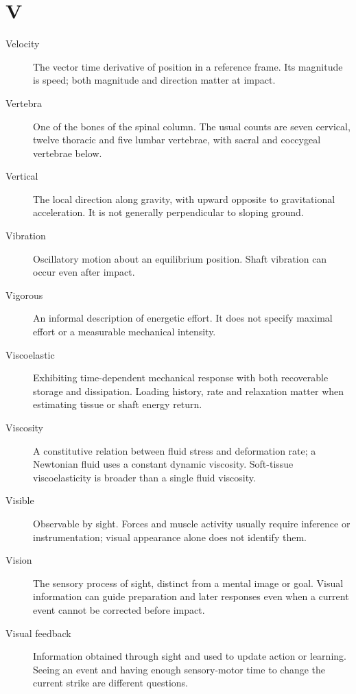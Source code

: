 \section*{V}
\begin{description}

\item[Velocity] The vector time derivative of position in a reference frame. Its magnitude is speed; both magnitude and direction matter at impact.

\item[Vertebra] One of the bones of the spinal column. The usual counts are seven cervical, twelve thoracic and five lumbar vertebrae, with sacral and coccygeal vertebrae below.

\item[Vertical] The local direction along gravity, with upward opposite to gravitational acceleration. It is not generally perpendicular to sloping ground.

\item[Vibration] Oscillatory motion about an equilibrium position. Shaft vibration can occur even after impact.

\item[Vigorous] An informal description of energetic effort. It does not specify maximal effort or a measurable mechanical intensity.

\item[Viscoelastic] Exhibiting time-dependent mechanical response with both recoverable storage and dissipation. Loading history, rate and relaxation matter when estimating tissue or shaft energy return.

\item[Viscosity] A constitutive relation between fluid stress and deformation rate; a Newtonian fluid uses a constant dynamic viscosity. Soft-tissue viscoelasticity is broader than a single fluid viscosity.

\item[Visible] Observable by sight. Forces and muscle activity usually require inference or instrumentation; visual appearance alone does not identify them.

\item[Vision] The sensory process of sight, distinct from a mental image or goal. Visual information can guide preparation and later responses even when a current event cannot be corrected before impact.

\item[Visual feedback] Information obtained through sight and used to update action or learning. Seeing an event and having enough sensory-motor time to change the current strike are different questions.


\end{description}
